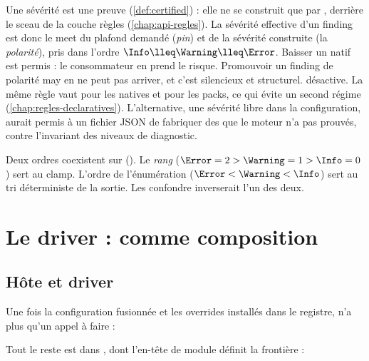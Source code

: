 \begin{decision}
Une sévérité \Error{} est une preuve (\cref{def:certified}) : elle ne se construit que par , derrière le sceau de la couche règles (\cref{chap:api-regles}). La sévérité effective d'un finding est donc le meet du plafond demandé (\emph{pin}) et de la sévérité construite (la \emph{polarité}), pris dans l'ordre $\Info \lleq \Warning \lleq \Error$. Baisser un \Error{} natif est permis : le consommateur en prend le risque. Promouvoir un finding de polarité may en \Error{} ne peut pas arriver, et c'est silencieux et structurel.  désactive. La même règle vaut pour les natives et pour les packs, ce qui évite un second régime (\cref{chap:regles-declaratives}). L'alternative, une sévérité libre dans la configuration, aurait permis à un fichier JSON de fabriquer des \Error{} que le moteur n'a pas prouvés, contre l'invariant des niveaux de diagnostic.
\end{decision}

\begin{remarque}
Deux ordres coexistent sur  (). Le \emph{rang} ($\Error = 2 > \Warning = 1 > \Info = 0$) sert au clamp. L'ordre de l'énumération ($\Error < \Warning < \Info$) sert au tri déterministe de la sortie. Les confondre inverserait l'un des deux.
\end{remarque}

\section{Le driver :  comme composition}
\label{sec:projet-cli-driver-driver}

\subsection{Hôte et driver}

Une fois la configuration fusionnée et les overrides installés dans le registre,  n'a plus qu'un appel à faire :


Tout le reste est dans , dont l'en-tête de module définit la frontière :

